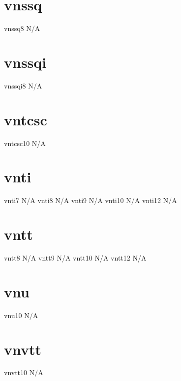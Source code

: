 \documentclass[sample]{vnsample}
\begin{document}
\section{vnssq}
   {vnssq8}   {N/A}

\section{vnssqi}
  {vnssqi8}  {N/A}

\section{vntcsc}
  {vntcsc10} {N/A}

\section{vnti}
   {vnti7}    {N/A}
   {vnti8}    {N/A}
   {vnti9}    {N/A}
   {vnti10}   {N/A}
   {vnti12}   {N/A}

\section{vntt}
   {vntt8}    {N/A}
   {vntt9}    {N/A}
   {vntt10}   {N/A}
   {vntt12}   {N/A}

\section{vnu}
    {vnu10}    {N/A}

\section{vnvtt}
  {vnvtt10}  {N/A}
\end{document}
